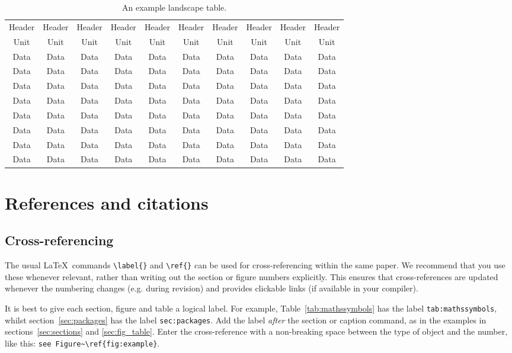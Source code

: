 \documentclass[a4paper,fleqn,usenatbib,useAMS]{mnras}
\begin{document}
\begin{landscape}
 \begin{table}
  \caption{An example landscape table.}
  \label{tab:landscape}
  \begin{tabular}{cccccccccc}
    \hline
    Header & Header & Header & Header & Header & Header & Header & Header & Header & Header\\
    Unit & Unit & Unit & Unit & Unit & Unit & Unit & Unit & Unit & Unit \\
    \hline
    Data & Data & Data & Data & Data & Data & Data & Data & Data & Data\\
    Data & Data & Data & Data & Data & Data & Data & Data & Data & Data\\
    Data & Data & Data & Data & Data & Data & Data & Data & Data & Data\\
    Data & Data & Data & Data & Data & Data & Data & Data & Data & Data\\
    Data & Data & Data & Data & Data & Data & Data & Data & Data & Data\\
    Data & Data & Data & Data & Data & Data & Data & Data & Data & Data\\
    Data & Data & Data & Data & Data & Data & Data & Data & Data & Data\\
    Data & Data & Data & Data & Data & Data & Data & Data & Data & Data\\
    \hline
  \end{tabular}
 \end{table}
\end{landscape}

\section{References and citations}

\subsection{Cross-referencing}

The usual \LaTeX\ commands \verb'\label{}' and \verb'\ref{}' can be used for cross-referencing within the same paper.
We recommend that you use these whenever relevant, rather than writing out the section or figure numbers explicitly.
This ensures that cross-references are updated whenever the numbering changes (e.g. during revision) and provides clickable links (if available in your compiler).

It is best to give each section, figure and table a logical label.
For example, Table~\ref{tab:mathssymbols} has the label \verb'tab:mathssymbols', whilst section~\ref{sec:packages} has the label \verb'sec:packages'.
Add the label \emph{after} the section or caption command, as in the examples in sections~\ref{sec:sections} and \ref{sec:fig_table}.
Enter the cross-reference with a non-breaking space between the type of object and the number, like this: \verb'see Figure~\ref{fig:example}'.
\end{document}
